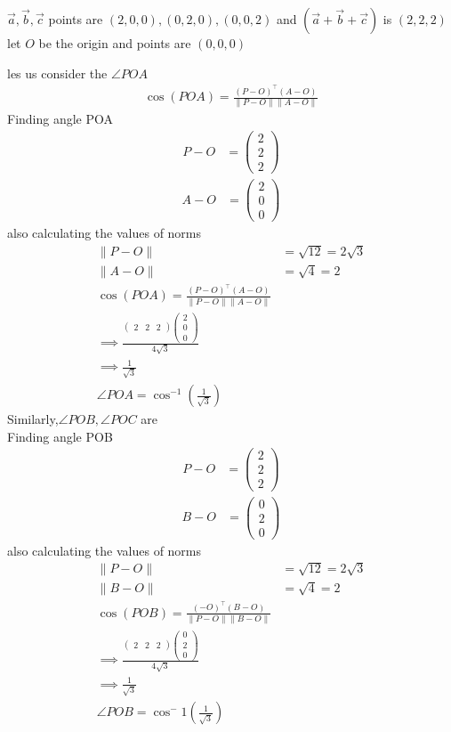 \documentclass{article}
\newcommand{\norm}[1]{\lVert#1\rVert}
\providecommand{\brak}[1]{\ensuremath{\left(#1\right)}}
\newcommand{\myvec}[1]{\ensuremath{\begin{pmatrix}#1\end{pmatrix}}}
\begin{document}
\begin{enumerate}
    
    $\vec{a},\vec{b},\vec{c}$ points are $\brak{2,0,0},\brak{0,2,0},\brak{0,0,2} $  and $\brak{\vec{a}+\vec{b}+\vec{c}}$ is $\brak{2,2,2}$ \\

    
    let $O$ be the origin and points are $\brak{0,0,0}$ 

    les us consider the $\angle POA$ 
    \begin{align}
	\cos{\brak{POA}} = \frac{(P-O)^\top(A-O)}{\norm{P-O}\norm{A-O}}
\end{align}
Finding angle POA  \\
\begin{align}
	P-O &=\myvec{2\\2\\2}
\end{align}
\begin{align}
	A-O &=\myvec{2\\0\\0}
\end{align}
also calculating the values of norms
\begin{align}
	\norm{P-O} &= \sqrt{12} = 2\sqrt{3} \\
	\norm{A-O} &= \sqrt{4} = 2\\
 \cos{\brak{POA}} = \frac{(P-O)^\top(A-O)}{\norm{P-O}\norm{A-O}}\\
 \implies \frac{\myvec{2&2&2}\myvec{2\\0\\0} }{4\sqrt{3}}\\
 \implies \frac{1}{\sqrt{3}}\\
\angle POA = \cos^{-1}\brak{{\frac{1}{\sqrt{3}}}}
\end{align}
Similarly,$\angle POB,\angle POC$ are\\


Finding angle POB  \\
\begin{align}
	P-O &=\myvec{2\\2\\2}
\end{align}
\begin{align}
	B-O &=\myvec{0\\2\\0}
\end{align}
also calculating the values of norms
\begin{align}
	\norm{P-O} &= \sqrt{12} = 2\sqrt{3} \\
	\norm{B-O} &= \sqrt{4} = 2\\
 \cos{\brak{POB}} = \frac{(-O)^\top(B-O)}{\norm{P-O}\norm{B-O}}\\
 \implies \frac{\myvec{2&2&2}\myvec{0\\2\\0} }{4\sqrt{3}}\\
 \implies \frac{1}{\sqrt{3}}\\
\angle POB = \cos^-{1}\brak{{\frac{1}{\sqrt{3}}}}
\end{align}



\end{enumerate}
\end{document}
